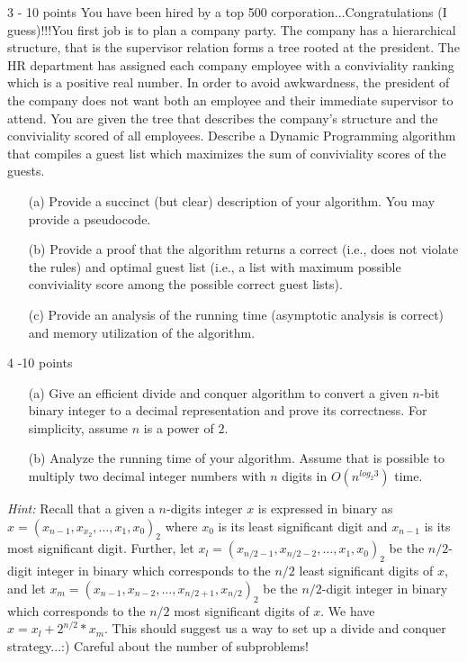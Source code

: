 \documentclass{common/cs157}
\begin{document}
\begin{problem}{3 - 10 points}
You have been hired by a top 500 corporation...Congratulations (I guess)!!!You first job is to plan a company party. The company has a hierarchical structure, that is the supervisor relation forms a tree rooted at the president. The HR department has assigned each company employee with a conviviality ranking which is a positive real number. In order to avoid awkwardness, the president of the company does not want both an employee and their immediate supervisor to attend. You are given the tree that describes the company's structure and the conviviality scored of all employees. Describe a Dynamic Programming algorithm that compiles a guest list which maximizes the sum of conviviality scores of the guests.
\begin{enumerate}
    \item[(a)] Provide a succinct (but clear) description of your algorithm. You may provide a pseudocode.
    \item[(b)] Provide a proof that the algorithm returns a correct (i.e., does not violate the rules) and optimal guest list (i.e., a list with maximum possible conviviality score among the possible correct guest lists).
    \item[(c)] Provide an analysis of the running time (asymptotic analysis is correct) and memory utilization of the algorithm.
\end{enumerate}

\end{problem}

\begin{problem}{4 -10 points}
\begin{enumerate}
    \item[(a)]Give an efficient divide and conquer algorithm to convert a given $n$-bit binary integer to a decimal representation and prove its correctness. For simplicity, assume $n$ is a power of $2$.
    \item[(b)] Analyze the running time of your algorithm. Assume that is possible to multiply two decimal integer numbers with $n$ digits in $O(n^{log_2 3})$ time. 
\end{enumerate}

\emph{Hint:} Recall that a given a $n$-digits integer $x$ is expressed in binary as $x=(x_{n-1},x_{x_2},\ldots, x_1,x_0)_2$
where $x_0$ is its least significant digit and $x_{n-1}$ is its most significant digit. Further, let $x_l=(x_{n/2-1},x_{n/2-2},\ldots,x_1,x_0)_2$ be the $n/2$-digit integer in binary which corresponds to the $n/2$ least significant digits of $x$, and let $x_m=(x_{n-1},x_{n-2},\ldots,x_{n/2+1},x_{n/2})_2$ be the $n/2$-digit integer in binary which corresponds to the $n/2$ most significant digits of $x$. We have $x=x_l+2^{n/2}*x_m$. This should suggest us a way to set up a divide and conquer strategy...:) Careful about the number of subproblems!
\end{problem}
\end{document}
